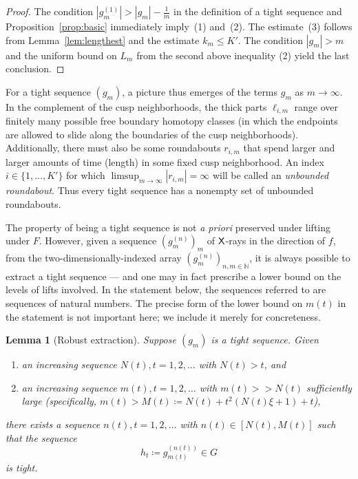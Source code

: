 \documentclass{amsart}
\newcommand\N{{\mathbb{N}}}
\newtheorem{lem}[thm]{Lemma}
\theoremstyle{definition}
\theoremstyle{remark}
\newcommand{\sfX}{{\sf X}}
\renewcommand\gg{>\!\!>}
\begin{document}
\begin{proof}
The condition $|g_m^{(1)}|>|g_m|-\frac{1}{m}$ in the definition of a tight sequence and Proposition~\ref{prop:basic} immediately imply~(1) and~(2). The estimate~(3) follows from Lemma~\ref{lem:lengthest} and the estimate $k_m \leq K'$. The condition $|g_m| > m$ and the uniform bound on $L_m$ from the second above inequality (2) yield the last conclusion. 
\end{proof}

For a tight sequence $(g_m)$, a picture thus emerges of the terms $g_m$ as $m\to\infty$.  In the complement of the cusp neighborhoods, the thick parts $\ell_{i,m}$ range over finitely many possible free boundary homotopy classes (in which the endpoints are allowed to slide along the boundaries of the cusp neighborhoods). Additionally, there must also be some roundabouts $r_{i,m}$ that spend larger and larger amounts of time (length) in some fixed cusp neighborhood.  An index $i\in \{1, \ldots, K'\}$ for which $\limsup_{m\to\infty} |r_{i,m}|=\infty$ will be called an \emph{unbounded roundabout}. Thus every tight sequence has a nonempty set of unbounded roundabouts. 

The property of being a tight sequence is not \emph{a priori} preserved under lifting under $F$.  However, given a sequence $(g_m^{(n)})_m$ of $\sfX$-rays in the direction of $f$, from the two-dimensionally-indexed array $(g^{(n)}_m)_{n,m\in \N}$, it is always possible to extract a tight sequence --- and one may in fact prescribe a lower bound on the levels of lifts involved. In the statement below, the sequences referred to are sequences of natural numbers.  The precise form of the lower bound on $m(t)$ in the statement is not important here; we include it merely for concreteness. 

\begin{lem}[Robust extraction]\label{lemma:extraction}
Suppose $(g_m)$ is a tight sequence.  Given
\begin{enumerate}
\item an increasing sequence $N(t), t=1, 2, \ldots$  with $N(t)>t$, and
\item an increasing sequence $m(t), t=1, 2, \ldots$  with $m(t)\gg N(t)$ sufficiently large (specifically, $m(t)>M(t)\coloneqq N(t)+t^2(N(t)\xi + 1)+t$),
\end{enumerate}
there exists a sequence $n(t), t=1, 2, \ldots$ with $n(t)\in [N(t), M(t)]$ such that the sequence 
\[ h_t\coloneqq g_{m(t)}^{(n(t))}\in G\]
is tight.
\end{lem} 
\end{document}
